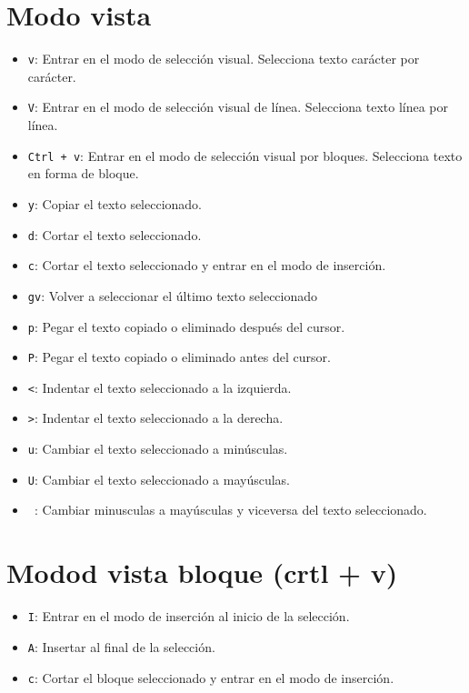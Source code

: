 \documentclass{article}[12pt,a4paper,twoside,utf8,spanish]
\theoremstyle{mytheoremstyle}
\theoremstyle{mytheoremstyle}
\theoremstyle{myproblemstyle}
\begin{document}
\begin{multicols}{2}
    \section{Modo vista }
    \begin{itemize}
        \item \texttt{v}: Entrar en el modo de selección visual. Selecciona texto carácter por carácter.
        \item \texttt{V}: Entrar en el modo de selección visual de línea. Selecciona texto línea por línea.
        \item \texttt{Ctrl + v}: Entrar en el modo de selección visual por bloques. Selecciona texto en forma de bloque.
        \item \texttt{y}: Copiar el texto seleccionado.
        \item \texttt{d}: Cortar el texto seleccionado.
        \item \texttt{c}: Cortar el texto seleccionado y entrar en el modo de inserción.
        \item \texttt{gv}: Volver a seleccionar el último texto seleccionado
        \item \texttt{p}: Pegar el texto copiado o eliminado después del cursor.
        \item \texttt{P}: Pegar el texto copiado o eliminado antes del cursor.
        \item \texttt{<}: Indentar el texto seleccionado a la izquierda.
        \item \texttt{>}: Indentar el texto seleccionado a la derecha.
        \item \texttt{u}: Cambiar el texto seleccionado a minúsculas.
        \item \texttt{U}: Cambiar el texto seleccionado a mayúsculas.
        \item \texttt{~}: Cambiar minusculas a mayúsculas y viceversa del texto seleccionado. 
    \end{itemize}
   \section{Modod vista bloque (crtl + v)}
    \begin{itemize}
        \item \texttt{I}: Entrar en el modo de inserción al inicio de la selección.
        \item \texttt{A}: Insertar al final de la selección.
        \item \texttt{c}: Cortar el bloque seleccionado y entrar en el modo de inserción.
        
    \end{itemize}
    \end{multicols}


         
\end{document}
